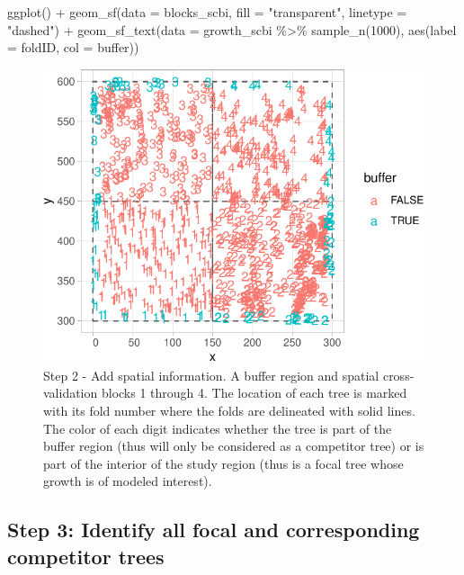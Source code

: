 \documentclass[12pt]{article}
\newenvironment{Shaded}{\begin{snugshade}}{\end{snugshade}}
\newcommand{\AttributeTok}[1]{\textcolor[rgb]{0.77,0.63,0.00}{#1}}
\newcommand{\DecValTok}[1]{\textcolor[rgb]{0.00,0.00,0.81}{#1}}
\newcommand{\FunctionTok}[1]{\textcolor[rgb]{0.00,0.00,0.00}{#1}}
\newcommand{\NormalTok}[1]{#1}
\newcommand{\SpecialCharTok}[1]{\textcolor[rgb]{0.00,0.00,0.00}{#1}}
\newcommand{\StringTok}[1]{\textcolor[rgb]{0.31,0.60,0.02}{#1}}
\begin{document}
\begin{Shaded}
\begin{Highlighting}[]
\FunctionTok{ggplot}\NormalTok{() }\SpecialCharTok{+} \FunctionTok{geom\_sf}\NormalTok{(}\AttributeTok{data =}\NormalTok{ blocks\_scbi, }\AttributeTok{fill =} \StringTok{"transparent"}\NormalTok{, }\AttributeTok{linetype =} \StringTok{"dashed"}\NormalTok{) }\SpecialCharTok{+}
    \FunctionTok{geom\_sf\_text}\NormalTok{(}\AttributeTok{data =}\NormalTok{ growth\_scbi }\SpecialCharTok{\%\textgreater{}\%}
        \FunctionTok{sample\_n}\NormalTok{(}\DecValTok{1000}\NormalTok{), }\FunctionTok{aes}\NormalTok{(}\AttributeTok{label =}\NormalTok{ foldID, }\AttributeTok{col =}\NormalTok{ buffer))}
\end{Highlighting}
\end{Shaded}

\begin{figure}

{\centering \includegraphics[width=0.66\linewidth]{Figures/scbi-spatial-information-1} 

}

\caption{Step 2 - Add spatial information. A buffer region and spatial cross-validation blocks 1 through 4. The location of each tree is marked with its fold number where the folds are delineated with solid lines. The color of each digit indicates whether the tree is part of the buffer region (thus will only be considered as a competitor tree) or is part of the interior of the study region (thus is a focal tree whose growth is of modeled interest).}\label{fig:scbi-spatial-information}
\end{figure}

\hypertarget{focal-vs-comp}{%
\subsection{Step 3: Identify all focal and corresponding competitor
trees}\label{focal-vs-comp}}
\end{document}
